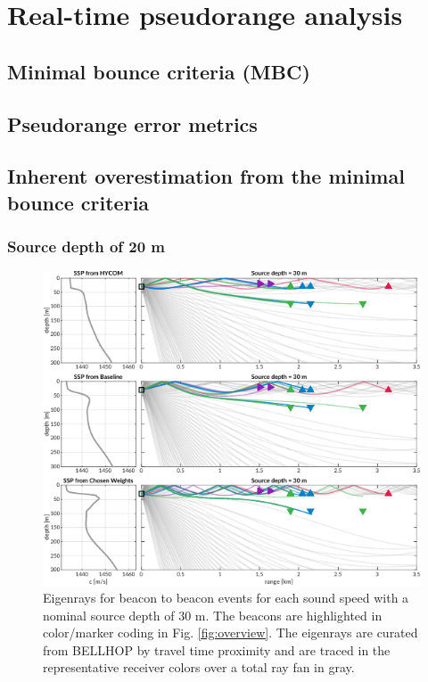 \clearpage
\section{\label{sec:realtime} Real-time pseudorange analysis}

\subsection{Minimal bounce criteria (MBC)}

\subsection{Pseudorange error metrics}

\subsection{Inherent overestimation from the minimal bounce criteria}

\subsubsection{Source depth of 20 m}
\begin{figure}[h!]
  \centering
  \includegraphics[width=\reprintcolumnwidth]{figs/Fig4.pdf}
  \caption{Eigenrays for beacon to beacon events for each sound speed with a nominal source depth of 30 m. The beacons are highlighted in color/marker coding in Fig. \ref{fig:overview}. The eigenrays are curated from BELLHOP by travel time proximity and are traced in the representative receiver colors over a total ray fan in gray.}
  \label{fig:raytrace-zs20}
\end{figure}


